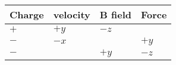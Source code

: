 		\begin{tabular}{||l|l|l|l||} \hline
		 Charge &  velocity & B field & Force\\ \hline\hline
		 $ + $ & $ +y $ & $ -z $ &        \\ \hline
		 $ - $ & $ -x $ &        &  $ +y $\\  \hline 
		 $ - $ &        & $ +y$  &  $ -z $\\  \hline 
		\end{tabular}
